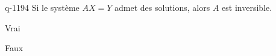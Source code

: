 \begin{truefalse}{q-1194}
Si le système $AX = Y$ admet des solutions, alors $A$ est inversible.
\item Vrai
\item* Faux
\end{truefalse}

